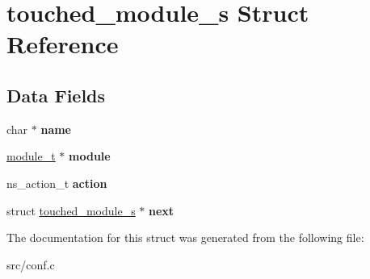 \hypertarget{structtouched__module__s}{}\section{touched\+\_\+module\+\_\+s Struct Reference}
\label{structtouched__module__s}
\subsection*{Data Fields}
\begin{DoxyCompactItemize}
\item 
\mbox{\label{structtouched__module__s_aaf93716852c5cdb7f15750311bb273dc}} 
char $\ast$ {\bfseries name}
\item 
\mbox{\label{structtouched__module__s_aea244a2ddce675410569524975807767}} 
\hyperlink{structmodule__s}{module\+\_\+t} $\ast$ {\bfseries module}
\item 
\mbox{\label{structtouched__module__s_ad39729637f3103df34cf8633a1b92df0}} 
ns\+\_\+action\+\_\+t {\bfseries action}
\item 
\mbox{\label{structtouched__module__s_a3f84541c61a49de0b03efe6bc5846085}} 
struct \hyperlink{structtouched__module__s}{touched\+\_\+module\+\_\+s} $\ast$ {\bfseries next}
\end{DoxyCompactItemize}


The documentation for this struct was generated from the following file\+:\begin{DoxyCompactItemize}
\item 
src/conf.\+c\end{DoxyCompactItemize}
